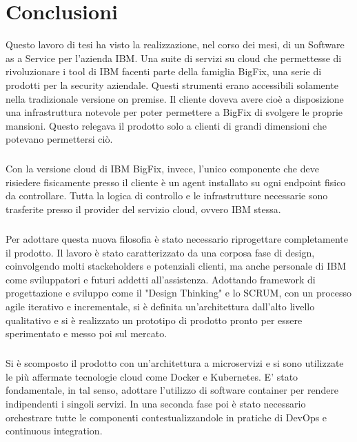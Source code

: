 \chapter{Conclusioni}

Questo lavoro di tesi ha visto la realizzazione, nel corso dei mesi, di un Software as a Service per l'azienda IBM. Una suite di servizi su cloud che permettesse di rivoluzionare i tool di IBM facenti parte della famiglia BigFix, una serie di prodotti per la security aziendale. Questi strumenti erano accessibili solamente nella tradizionale versione on premise. Il cliente doveva avere cioè a disposizione una infrastruttura notevole per poter permettere a BigFix di svolgere le proprie mansioni. Questo relegava il prodotto solo a clienti di grandi dimensioni che potevano permettersi ciò. 
\paragraph{}
Con la versione cloud di IBM BigFix, invece, l'unico componente che deve risiedere fisicamente presso il cliente è un agent installato su ogni endpoint fisico da controllare. Tutta la logica di controllo e le infrastrutture necessarie sono trasferite presso il provider del servizio cloud, ovvero IBM stessa.

\paragraph{}
Per adottare questa nuova filosofia è stato necessario riprogettare completamente il prodotto. Il lavoro è stato caratterizzato da una corposa fase di design, coinvolgendo molti stackeholders e potenziali clienti, ma anche personale di IBM come sviluppatori e futuri addetti all'assistenza. Adottando framework di progettazione e sviluppo come il "Design Thinking" e lo SCRUM, con un processo agile iterativo e incrementale, si è definita un'architettura dall'alto livello qualitativo e si è realizzato un prototipo di prodotto pronto per essere sperimentato e messo poi sul mercato.
\paragraph{}
Si è scomposto il prodotto con un'architettura a microservizi e si sono utilizzate le più affermate tecnologie cloud come Docker e Kubernetes. E' stato fondamentale, in tal senso, adottare l'utilizzo di software container per rendere indipendenti i singoli servizi. In una seconda fase poi è stato necessario orchestrare tutte le componenti contestualizzandole in pratiche di DevOps e continuous integration.

